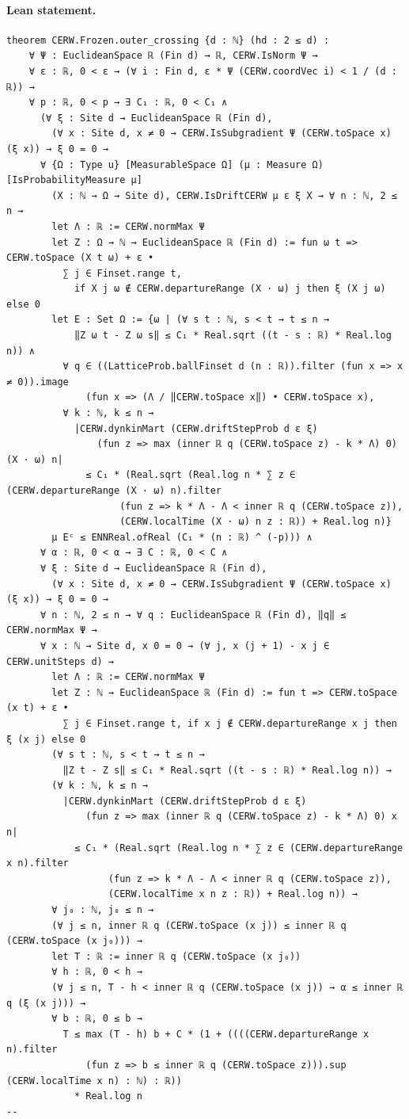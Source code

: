 \paragraph{Lean statement.}
\begin{verbatim}
theorem CERW.Frozen.outer_crossing {d : ℕ} (hd : 2 ≤ d) :
    ∀ Ψ : EuclideanSpace ℝ (Fin d) → ℝ, CERW.IsNorm Ψ →
    ∀ ε : ℝ, 0 < ε → (∀ i : Fin d, ε * Ψ (CERW.coordVec i) < 1 / (d : ℝ)) →
    ∀ p : ℝ, 0 < p → ∃ C₁ : ℝ, 0 < C₁ ∧
      (∀ ξ : Site d → EuclideanSpace ℝ (Fin d),
        (∀ x : Site d, x ≠ 0 → CERW.IsSubgradient Ψ (CERW.toSpace x) (ξ x)) → ξ 0 = 0 →
      ∀ {Ω : Type u} [MeasurableSpace Ω] (μ : Measure Ω) [IsProbabilityMeasure μ]
        (X : ℕ → Ω → Site d), CERW.IsDriftCERW μ ε ξ X → ∀ n : ℕ, 2 ≤ n →
        let Λ : ℝ := CERW.normMax Ψ
        let Z : Ω → ℕ → EuclideanSpace ℝ (Fin d) := fun ω t => CERW.toSpace (X t ω) + ε •
          ∑ j ∈ Finset.range t,
            if X j ω ∉ CERW.departureRange (X · ω) j then ξ (X j ω) else 0
        let E : Set Ω := {ω | (∀ s t : ℕ, s < t → t ≤ n →
            ‖Z ω t - Z ω s‖ ≤ C₁ * Real.sqrt ((t - s : ℝ) * Real.log n)) ∧
          ∀ q ∈ ((LatticeProb.ballFinset d (n : ℝ)).filter (fun x => x ≠ 0)).image
              (fun x => (Λ / ‖CERW.toSpace x‖) • CERW.toSpace x),
          ∀ k : ℕ, k ≤ n →
            |CERW.dynkinMart (CERW.driftStepProb d ε ξ)
                (fun z => max (inner ℝ q (CERW.toSpace z) - k * Λ) 0) (X · ω) n|
              ≤ C₁ * (Real.sqrt (Real.log n * ∑ z ∈ (CERW.departureRange (X · ω) n).filter
                    (fun z => k * Λ - Λ < inner ℝ q (CERW.toSpace z)),
                    (CERW.localTime (X · ω) n z : ℝ)) + Real.log n)}
        μ Eᶜ ≤ ENNReal.ofReal (C₁ * (n : ℝ) ^ (-p))) ∧
      ∀ α : ℝ, 0 < α → ∃ C : ℝ, 0 < C ∧
      ∀ ξ : Site d → EuclideanSpace ℝ (Fin d),
        (∀ x : Site d, x ≠ 0 → CERW.IsSubgradient Ψ (CERW.toSpace x) (ξ x)) → ξ 0 = 0 →
      ∀ n : ℕ, 2 ≤ n → ∀ q : EuclideanSpace ℝ (Fin d), ‖q‖ ≤ CERW.normMax Ψ →
      ∀ x : ℕ → Site d, x 0 = 0 → (∀ j, x (j + 1) - x j ∈ CERW.unitSteps d) →
        let Λ : ℝ := CERW.normMax Ψ
        let Z : ℕ → EuclideanSpace ℝ (Fin d) := fun t => CERW.toSpace (x t) + ε •
          ∑ j ∈ Finset.range t, if x j ∉ CERW.departureRange x j then ξ (x j) else 0
        (∀ s t : ℕ, s < t → t ≤ n →
          ‖Z t - Z s‖ ≤ C₁ * Real.sqrt ((t - s : ℝ) * Real.log n)) →
        (∀ k : ℕ, k ≤ n →
          |CERW.dynkinMart (CERW.driftStepProb d ε ξ)
              (fun z => max (inner ℝ q (CERW.toSpace z) - k * Λ) 0) x n|
            ≤ C₁ * (Real.sqrt (Real.log n * ∑ z ∈ (CERW.departureRange x n).filter
                  (fun z => k * Λ - Λ < inner ℝ q (CERW.toSpace z)),
                  (CERW.localTime x n z : ℝ)) + Real.log n)) →
        ∀ j₀ : ℕ, j₀ ≤ n →
        (∀ j ≤ n, inner ℝ q (CERW.toSpace (x j)) ≤ inner ℝ q (CERW.toSpace (x j₀))) →
        let T : ℝ := inner ℝ q (CERW.toSpace (x j₀))
        ∀ h : ℝ, 0 < h →
        (∀ j ≤ n, T - h < inner ℝ q (CERW.toSpace (x j)) → α ≤ inner ℝ q (ξ (x j))) →
        ∀ b : ℝ, 0 ≤ b →
          T ≤ max (T - h) b + C * (1 + ((((CERW.departureRange x n).filter
              (fun z => b ≤ inner ℝ q (CERW.toSpace z))).sup (CERW.localTime x n) : ℕ) : ℝ))
            * Real.log n
--
\end{verbatim}
